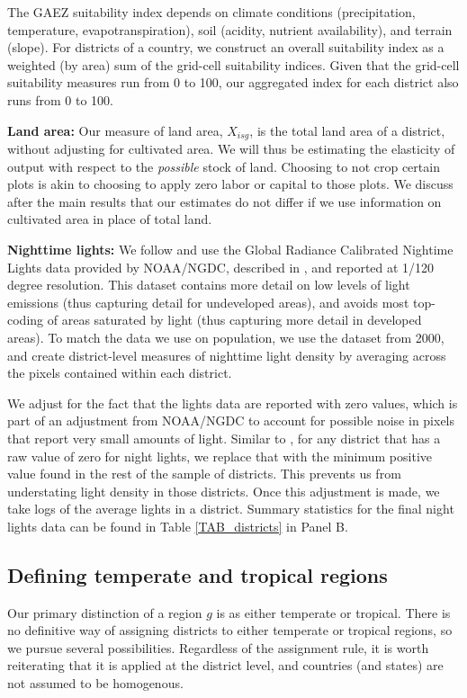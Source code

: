 \documentclass[11pt]{article}
\begin{document}
The GAEZ suitability index depends on climate conditions (precipitation, temperature, evapotranspiration), soil (acidity, nutrient availability), and terrain (slope). For districts of a country, we construct an overall suitability index as a weighted (by area) sum of the grid-cell suitability indices. Given that the grid-cell suitability measures run from 0 to 100, our aggregated index for each district also runs from 0 to 100.

\vspace{.5cm}\noindent\textbf{Land area:} Our measure of land area, $X_{isg}$, is the total land area of a district, without adjusting for cultivated area. We will thus be estimating the elasticity of output with respect to the \textit{possible} stock of land. Choosing to not crop certain plots is akin to choosing to apply zero labor or capital to those plots. We discuss after the main results that our estimates do not differ if we use information on cultivated area in place of total land.

\vspace{.5cm}\noindent\textbf{Nighttime lights:} We follow \citet{hssw2016} and use the Global Radiance Calibrated Nightime Lights data provided by NOAA/NGDC, described in \citet{Elvidge1999}, and reported at 1/120 degree resolution. This dataset contains more detail on low levels of light emissions (thus capturing detail for undeveloped areas), and avoids most top-coding of areas saturated by light (thus capturing more detail in developed areas). To match the data we use on population, we use the dataset from 2000, and create district-level measures of nighttime light density by averaging across the pixels contained within each district.

We adjust for the fact that the lights data are reported with zero values, which is part of an adjustment from NOAA/NGDC to account for possible noise in pixels that report very small amounts of light. Similar to \citet{hssw2016}, for any district that has a raw value of zero for night lights, we replace that with the minimum positive value found in the rest of the sample of districts. This prevents us from understating light density in those districts. Once this adjustment is made, we take logs of the average lights in a district. Summary statistics for the final night lights data can be found in Table \ref{TAB_districts} in Panel B.

\subsection{Defining temperate and tropical regions}
Our primary distinction of a region $g$ is as either temperate or tropical. There is no definitive way of assigning districts to either temperate or tropical regions, so we pursue several possibilities. Regardless of the assignment rule, it is worth reiterating that it is applied at the district level, and countries (and states) are not assumed to be homogenous. 
\end{document}
